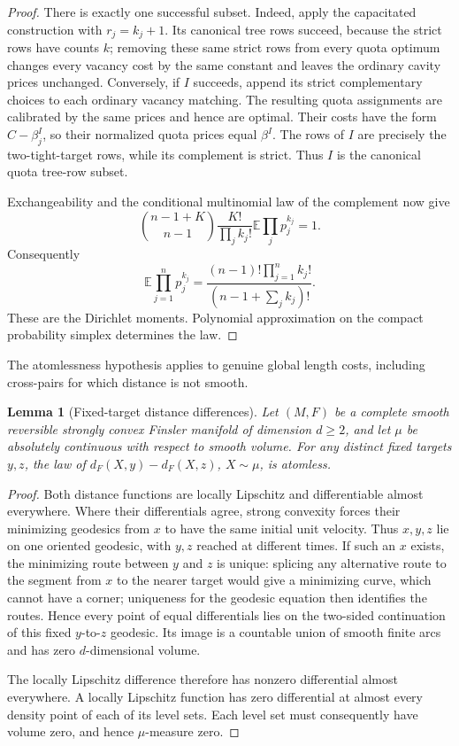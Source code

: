 \documentclass[11pt,reqno]{amsart}
\newtheorem{lemma}[theorem]{Lemma}
\theoremstyle{definition}
\theoremstyle{remark}
\numberwithin{equation}{section}
\newcommand{\E}{\mathbb E}
\begin{document}
\begin{proof}
There is exactly one successful subset. Indeed, apply the capacitated
construction with \(r_j=k_j+1\). Its canonical tree rows succeed,
because the strict rows have counts \(k\); removing these same strict
rows from every quota optimum changes every vacancy cost by the same
constant and leaves the ordinary cavity prices unchanged. Conversely,
if \(I\) succeeds, append its strict complementary choices to each
ordinary vacancy matching. The resulting quota assignments are
calibrated by the same prices and hence are optimal. Their costs have
the form \(C-\beta_j^I\), so their normalized quota prices equal
\(\beta^I\). The rows of \(I\) are precisely the two-tight-target
rows, while its complement is strict. Thus \(I\) is the canonical
quota tree-row subset.

Exchangeability and the conditional multinomial law of the complement
now give
\[
 \binom{n-1+K}{n-1}\frac{K!}{\prod_j k_j!}
       \E\prod_j p_j^{k_j}=1.
\]
Consequently
\begin{equation}
\label{eq:iid-cavity-moments}
 \E\prod_{j=1}^n p_j^{k_j}
   =\frac{(n-1)!\prod_{j=1}^n k_j!}{(n-1+\sum_j k_j)!}.
\end{equation}
These are the Dirichlet moments. Polynomial approximation on the
compact probability simplex determines the law.
\end{proof}

The atomlessness hypothesis applies to genuine global length costs,
including cross-pairs for which distance is not smooth.

\begin{lemma}[Fixed-target distance differences]
\label{lem:distance-difference-nonatomic}
Let \((M,F)\) be a complete smooth reversible strongly convex Finsler
manifold of dimension \(d\ge2\), and let \(\mu\) be absolutely
continuous with respect to smooth volume. For any distinct fixed
targets \(y,z\), the law of
\(d_F(X,y)-d_F(X,z)\), \(X\sim\mu\), is atomless.
\end{lemma}

\begin{proof}
Both distance functions are locally Lipschitz and differentiable almost
everywhere. Where their differentials agree, strong convexity forces
their minimizing geodesics from \(x\) to have the same initial unit
velocity. Thus \(x,y,z\) lie on one oriented geodesic, with \(y,z\)
reached at different times. If such an \(x\) exists, the minimizing
route between \(y\) and \(z\) is unique: splicing any alternative
route to the segment from \(x\) to the nearer target would give a
minimizing curve, which cannot have a corner; uniqueness for the
geodesic equation then identifies the routes. Hence every point of
equal differentials lies on the two-sided continuation of this fixed
\(y\)-to-\(z\) geodesic. Its image is a countable union of smooth
finite arcs and has zero \(d\)-dimensional volume.

The locally Lipschitz difference therefore has nonzero differential
almost everywhere. A locally Lipschitz function has zero differential
at almost every density point of each of its level sets. Each level
set must consequently have volume zero, and hence \(\mu\)-measure
zero.
\end{proof}
\end{document}
